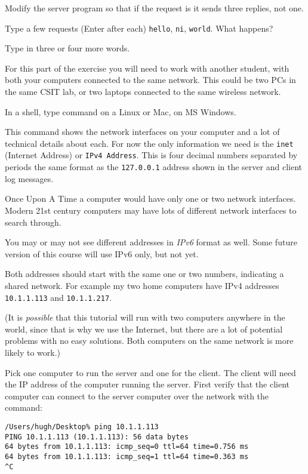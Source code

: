 \STEP Modify the server program so that if the request is  it sends three replies,
not one.

Type a few requests (Enter after each) \texttt{hello}, \texttt{ni}, \texttt{world}.
What happens?

Type in three or four more words.



For this part of the exercise you will need to work with another student, with both your
computers connected to the same network. This could be two PCs in the same CSIT lab, or
two laptops connected to the same wireless network.

In a shell, type command  on a Linux or Mac,  on MS Windows.

This command shows the network interfaces on your computer and a lot of technical details
about each. For now the only information we need is the \texttt{inet} (Internet Address)
or \texttt{IPv4 Address}. This is four decimal numbers separated by periods \DSH the same
format as the \texttt{127.0.0.1} address shown in the server and client log messages.

\begin{IMPORTANT}
Once Upon A Time a computer would have only one or two network interfaces. Modern 21st
century computers may have lots of different network interfaces to search through.

You may or may not see different addresses in \emph{IPv6} format as well. Some future version
of this course will use IPv6 only, but not yet.
\end{IMPORTANT}

Both addresses should start with the same one or two numbers, indicating a shared network.
For example my two home computers have IPv4 addresses \texttt{10.1.1.113}
and \texttt{10.1.1.217}.

(It is \emph{possible} that this tutorial will run with two computers anywhere in the world,
since that is why we use the Internet, but there are a lot of potential problems
with no easy solutions. Both computers on the same network is more likely to work.)

Pick one computer to run the server and one for the client. The client will need the IP
address of the computer running the server. First verify that the client computer can
connect to the server computer over the network with the  command:

\begin{CODE}\begin{verbatim}
/Users/hugh/Desktop% ping 10.1.1.113
PING 10.1.1.113 (10.1.1.113): 56 data bytes
64 bytes from 10.1.1.113: icmp_seq=0 ttl=64 time=0.756 ms
64 bytes from 10.1.1.113: icmp_seq=1 ttl=64 time=0.363 ms
^C
\end{verbatim}\end{CODE}

